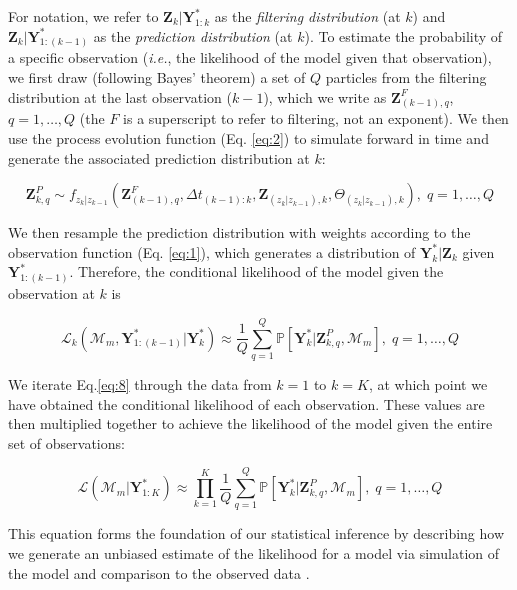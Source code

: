 \documentclass{article}
\begin{document}
For notation, we refer to $\textbf{Z}_{k}|\textbf{Y}^*_{1:k}$ as the \emph{filtering distribution} (at $k$) and $\textbf{Z}_{k}|\textbf{Y}^*_{1:(k-1)}$ as the \emph{prediction distribution} (at $k$). To estimate the probability of a specific observation (\emph{i.e.}, the likelihood of the model given that observation), we first draw (following Bayes' theorem) a set of $Q$ particles from the filtering distribution at the last observation ($k-1$), which we write as $\textbf{Z}^{F}_{(k-1),q}$, $q = 1, \ldots, Q$ (the $F$ is a superscript to refer to filtering, not an exponent). We then use the process evolution function (Eq. \ref{eq:2}) to simulate forward in time and generate the associated prediction distribution at $k$:

\begin{equation}
\label{eq:7}
\textbf{Z}^{P}_{k,q} \sim f_{z_k|z_{k-1}}(\textbf{Z}^{F}_{(k-1),q}, \Delta t_{(k-1):k}, \textbf{Z}_{(z_k|z_{k-1}), k},\Theta_{(z_k|z_{k-1}), k}), \; q = 1, \ldots, Q
\end{equation}

We then resample the prediction distribution with weights according to the observation function (Eq. \ref{eq:1}), which generates a distribution of $\textbf{Y}^{*}_{k}|\textbf{Z}_{k}$ given $\textbf{Y}^{*}_{1:(k-1)}$. Therefore, the conditional likelihood of the model given the observation at $k$ is

\begin{equation}
\label{eq:8}
\mathcal{L}_k(\mathcal{M}_m, \textbf{Y}^{*}_{1:(k-1)} | \textbf{Y}^{*}_{k}) \approx \frac{1}{Q}\sum_{q=1}^{Q}{\mathbb{P}[\textbf{Y}^*_k|\textbf{Z}^{P}_{k, q}, \mathcal{M}_m]}, \; q = 1, \ldots, Q
\end{equation}

We iterate Eq.\ref{eq:8} through the data from $k = 1$ to $k = K$, at which point we have obtained the conditional likelihood of each observation. These values are then multiplied together to achieve the likelihood of the model given the entire set of observations:

\begin{equation}
\label{eq:9}
\mathcal{L}(\mathcal{M}_m | \textbf{Y}^{*}_{1:K}) \approx \prod_{k = 1}^{K}{\frac{1}{Q}\sum_{q=1}^{Q}{\mathbb{P}[\textbf{Y}^*_k|\textbf{Z}^{P}_{k, q}, \mathcal{M}_m]}}, \; q = 1, \ldots, Q
\end{equation}

This equation forms the foundation of our statistical inference by describing how we generate an unbiased estimate of the likelihood for a model via simulation of the model and comparison to the observed data \citep{Doucet2001, King2016}.
\end{document}
